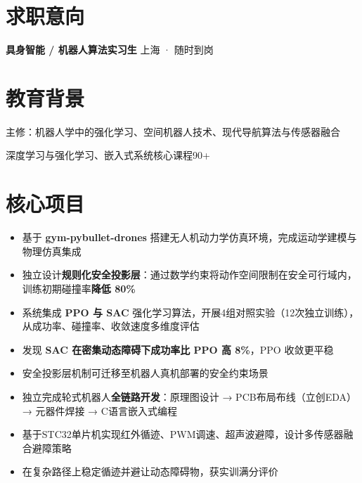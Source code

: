 \documentclass{resume}
\begin{document}

\section{求职意向}
\vspace{-4pt}
\textbf{具身智能 / 机器人算法实习生} \hfill 上海 · 随时到岗

\section{教育背景}
主修：机器人学中的强化学习、空间机器人技术、现代导航算法与传感器融合

深度学习与强化学习、嵌入式系统核心课程90+

\section{核心项目}
\begin{itemize}
  \item 基于 \textbf{gym-pybullet-drones} 搭建无人机动力学仿真环境，完成运动学建模与物理仿真集成
  \item 独立设计\textbf{规则化安全投影层}：通过数学约束将动作空间限制在安全可行域内，训练初期碰撞率\textbf{降低 80\%}
  \item 系统集成 \textbf{PPO 与 SAC} 强化学习算法，开展4组对照实验（12次独立训练），从成功率、碰撞率、收敛速度多维度评估
  \item 发现 \textbf{SAC 在密集动态障碍下成功率比 PPO 高 8\%}，PPO 收敛更平稳
  \item 安全投影层机制可迁移至机器人真机部署的安全约束场景
\end{itemize}

\begin{itemize}
  \item 独立完成轮式机器人\textbf{全链路开发}：原理图设计 → PCB布局布线（立创EDA）→ 元器件焊接 → C语言嵌入式编程
  \item 基于STC32单片机实现红外循迹、PWM调速、超声波避障，设计多传感器融合避障策略
  \item 在复杂路径上稳定循迹并避让动态障碍物，获实训满分评价
\end{itemize}
\end{document}
